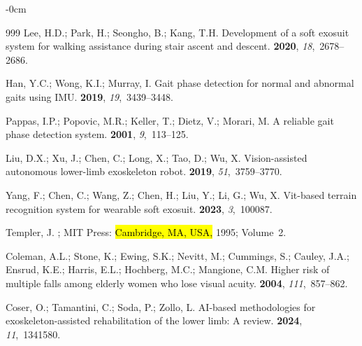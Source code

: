 \documentclass[actuators,article,accept,pdftex,moreauthors]{Definitions/mdpi}
\begin{document}
\begin{adjustwidth}{-\extralength}{0cm}
\begin{thebibliography}{999}
Lee, H.D.; Park, H.; Seongho, B.; Kang, T.H.
\newblock Development of a soft exosuit system for walking assistance during
  stair ascent and descent.
 {\bf
  2020}, {\em 18},~2678--2686.

Han, Y.C.; Wong, K.I.; Murray, I.
\newblock Gait phase detection for normal and abnormal gaits using IMU.
 {\bf 2019}, {\em 19},~3439--3448.

Pappas, I.P.; Popovic, M.R.; Keller, T.; Dietz, V.; Morari, M.
\newblock A reliable gait phase detection system.
 {\bf 2001}, {\em 9},~113--125.

Liu, D.X.; Xu, J.; Chen, C.; Long, X.; Tao, D.; Wu, X.
\newblock Vision-assisted autonomous lower-limb exoskeleton robot.
  {\bf 2019}, {\em 51},~3759--3770.

Yang, F.; Chen, C.; Wang, Z.; Chen, H.; Liu, Y.; Li, G.; Wu, X.
\newblock Vit-based terrain recognition system for wearable soft exosuit.
 {\bf 2023}, {\em
  3},~100087.

Templer, J.
;
   MIT Press:  \hl{Cambridge, MA, USA,} %
   1995; Volume~2.

Coleman, A.L.; Stone, K.; Ewing, S.K.; Nevitt, M.; Cummings, S.; Cauley, J.A.;
  Ensrud, K.E.; Harris, E.L.; Hochberg, M.C.; Mangione, C.M.
\newblock Higher risk of multiple falls among elderly women who lose visual
  acuity.
 {\bf 2004}, {\em 111},~857--862.

Coser, O.; Tamantini, C.; Soda, P.; Zollo, L.
\newblock AI-based methodologies for exoskeleton-assisted rehabilitation of the
  lower limb: A review.
 {\bf 2024}, {\em 11},~1341580.


\end{thebibliography}
\end{adjustwidth}
\end{document}
